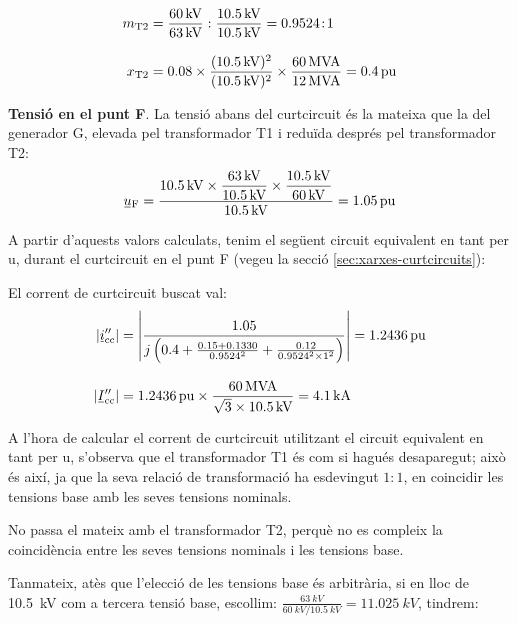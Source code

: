 \begin{exemple}[\MetodeCalculPU{}]
    \begin{align*}
    m_\mathrm{T2} &= \frac{\qty{60}{kV}}{\qty{63}{kV}} :
    \frac{\qty{10,5}{kV}}{\qty{10,5}{kV}} = \num{0,9524}\!:\!1 \\[3mm]
    x_\mathrm{T2} &= \num{0,08} \times \frac{(\qty{10,5}{kV})^2}{(\qty{10,5}{kV})^2} \times
    \frac{\qty{60}{MVA}}{\qty{12}{MVA}}  = \qty{0,4}{pu}
    \end{align*}

    \textbf{Tensió en el punt F}. La tensió abans del curtcircuit és la mateixa que la del generador G, elevada pel transformador T1 i reduïda després pel transformador T2:
    \[
    \cmplx{u}\ped{F} = \frac{\qty{10,5}{kV} \times
    \dfrac{\qty{63}{kV}}{\qty{10,5}{kV}} \times
    \dfrac{\qty{10,5}{kV}}{\qty{60}{kV}}}{\qty{10,5}{kV}} = \qty{1,05}{pu}
    \]

    A partir d'aquests valors calculats, tenim el següent circuit equivalent en tant per u, durant el
    curtcircuit en el punt F (vegeu la secció \ref{sec:xarxes-curtcircuits}):

    \begin{center}
       
    \end{center}

    El corrent de curtcircuit buscat val:
    \begin{align*}
    |\cmplx{i}''\ped{cc}| &= \left| \frac{\num{1,05}}{j \left( \num{0,4} + \frac{\num{0,15} + \num{0,1330}}{\num{0,9524}^2} + \frac{\num{0,12}}{\num{0,9524}^2 \times 1^2} \right)} \right| =
     \qty{1,2436}{pu} \\[3mm]
     |\cmplx{I}''\ped{cc}| &= \qty{1,2436}{pu}\times\frac{\qty{60}{MVA}}{\sqrt{3}\times \qty{10,5}{kV}} =
     \qty{4,1}{kA}
    \end{align*}

     A l'hora de calcular el corrent de curtcircuit utilitzant el circuit equivalent en tant per u,
     s'observa que el transformador T1 és com si hagués desaparegut;
     això és així, ja que la seva relació de transformació ha esdevingut
     $1\!:\!1$, en coincidir les tensions base amb les seves tensions nominals.

     No passa el mateix amb el transformador T2, perquè no es compleix
     la coincidència entre les seves tensions nominals i les tensions
     base.

     Tanmateix, atès que l'elecció de les tensions base és
     arbitrària, si en lloc de \qty{10,5}{kV} com a tercera tensió base,
     escollim:
     $\frac{\qty{63}{kV}}{\qty{60}{kV} / \qty{10,5}{kV}}=\qty{11,025}{kV}$,
     tindrem:


\end{exemple}

